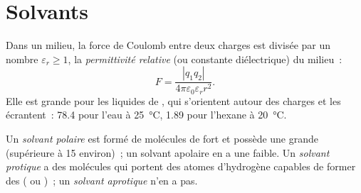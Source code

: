 \section{Solvants}

\begin{definition}\label{def:b1:intermolecular-forces-solvents:permittivity}
Dans un milieu, la force de Coulomb entre deux charges est divisée par
un nombre $\varepsilon_r \ge 1$, la \emph{permittivité relative}
(ou constante diélectrique) du milieu~:
\[
  F = \frac{|q_1 q_2|}{4\pi\varepsilon_0\varepsilon_r r^2} .
\]
Elle est grande pour les liquides de , qui s'orientent
autour des charges et les écrantent~: \num{78.4} pour l'eau à
\qty{25}{\celsius}, \num{1.89} pour l'hexane à \qty{20}{\celsius}.
\end{definition}

\begin{definition}\label{def:b1:intermolecular-forces-solvents:solvent-classes}
Un \emph{solvant polaire} est formé de molécules
de fort  et possède une grande 
(supérieure à 15 environ)~; un solvant apolaire en a une faible. Un
\emph{solvant protique} a des molécules qui
portent des atomes d'hydrogène capables de former des 
( ou )~; un \emph{solvant
aprotique} n'en a pas.
\end{definition}


